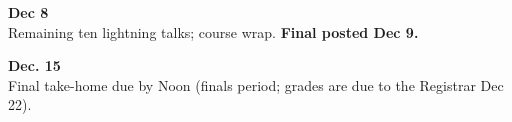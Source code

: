 \begin{innerlist}
\item {\bf\headerfont\color{RoyalBlue} Dec 8}\\ Remaining ten lightning talks; course wrap. {\bf Final posted Dec 9.}\smallskip

\item {\bf\headerfont\color{Red} Dec. 15\nth}\\ Final take-home due by Noon (finals period; grades are due to the Registrar Dec 22).\smallskip
\end{innerlist}
\smallskip
